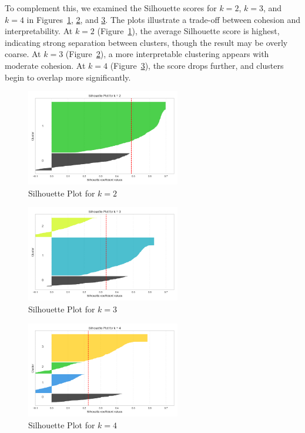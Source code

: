 \documentclass{article}
\begin{document}
To complement this, we examined the Silhouette scores for $k=2$, $k=3$, and $k=4$ in Figures~\ref{fig:silhouette_k2}, \ref{fig:silhouette_k3}, and \ref{fig:silhouette_k4}. The plots illustrate a trade-off between cohesion and interpretability. At $k=2$ (Figure~\ref{fig:silhouette_k2}), the average Silhouette score is highest, indicating strong separation between clusters, though the result may be overly coarse. At $k=3$ (Figure~\ref{fig:silhouette_k3}), a more interpretable clustering appears with moderate cohesion. At $k=4$ (Figure~\ref{fig:silhouette_k4}), the score drops further, and clusters begin to overlap more significantly.

\begin{figure}[H]
    \centering
    \includegraphics[width=0.6\textwidth]{figures/silhouette_k2.png}
    \caption{Silhouette Plot for $k=2$}
    \label{fig:silhouette_k2}
\end{figure}

\begin{figure}[H]
    \centering
    \includegraphics[width=0.6\textwidth]{figures/silhouette_k3.png}
    \caption{Silhouette Plot for $k=3$}
    \label{fig:silhouette_k3}
\end{figure}

\begin{figure}[H]
    \centering
    \includegraphics[width=0.6\textwidth]{figures/silhouette_k4.png}
    \caption{Silhouette Plot for $k=4$}
    \label{fig:silhouette_k4}
\end{figure}
\end{document}
